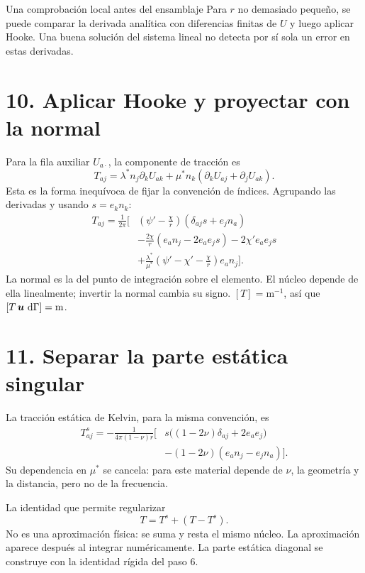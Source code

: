 \documentclass[11pt]{article}
\begin{document}
\begin{idea}{Una comprobación local antes del ensamblaje}
Para \(r\) no demasiado pequeño, se puede comparar la derivada analítica
con diferencias finitas de \(U\) y luego aplicar Hooke. Una buena solución
del sistema lineal no detecta por sí sola un error en estas derivadas.
\end{idea}

\newpage
\section*{10. Aplicar Hooke y proyectar con la normal}
Para la fila auxiliar \(U_{a\cdot}\), la componente de tracción es
\[
 \boxed{T_{aj}=\lambda^*n_j\partial_kU_{ak}
       +\mu^*n_k(\partial_kU_{aj}+\partial_jU_{ak}).}
\]
Esta es la forma inequívoca de fijar la convención de índices.
Agrupando las derivadas y usando \(s=e_kn_k\):
\[
\boxed{\begin{aligned}
 T_{aj}=\frac1{2\pi}\bigg[
 &\left(\psi'-\frac{\chi}{r}\right)(\delta_{aj}s+e_jn_a)\\
 &-\frac{2\chi}{r}(e_an_j-2e_ae_js)
 -2\chi'e_ae_js\\
 &+\frac{\lambda^*}{\mu^*}
   \left(\psi'-\chi'-\frac{\chi}{r}\right)e_an_j
 \bigg].
\end{aligned}}
\]
La normal es la del punto de integración sobre el elemento.
El núcleo depende de ella linealmente; invertir la normal cambia su signo.
\([T]=\mathrm m^{-1}\), así que
\([T\,\bm{u}\,\,\mathrm{d}\Gamma]=\mathrm m\).

\section*{11. Separar la parte estática singular}
La tracción estática de Kelvin, para la misma convención, es
\[
\boxed{\begin{aligned}
 T^s_{aj}=-\frac1{4\pi(1-\nu)r}
 \bigl[&s\big((1-2\nu)\delta_{aj}+2e_ae_j\big)\\
       &-(1-2\nu)(e_an_j-e_jn_a)\bigr].
\end{aligned}}
\]
Su dependencia en \(\mu^*\) se cancela: para este material depende de
\(\nu\), la geometría y la distancia, pero no de la frecuencia.

\begin{resultado}{La identidad que permite regularizar}
\[
 T=T^s+(T-T^s).
\]
No es una aproximación física: se suma y resta el mismo núcleo.
La aproximación aparece después al integrar numéricamente. La parte
estática diagonal se construye con la identidad rígida del paso 6.
\end{resultado}
\end{document}
